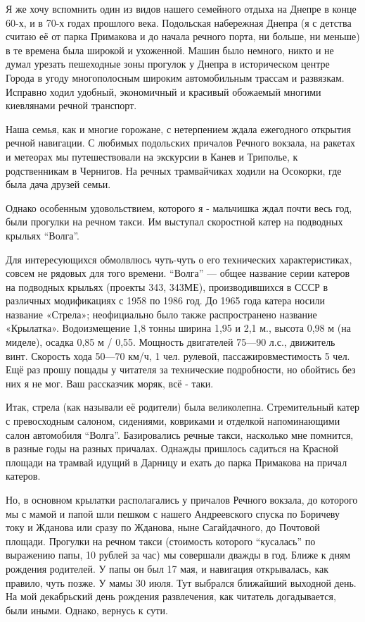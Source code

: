 Я же хочу вспомнить один из видов нашего семейного отдыха на Днепре в конце
60-х, и в 70-х годах прошлого века. Подольская набережная Днепра (я с детства
считаю её от парка Примакова и до начала речного порта, ни больше, ни меньше) в
те времена была широкой и ухоженной. Машин было немного, никто и не думал
урезать пешеходные зоны прогулок у Днепра в историческом центре Города в угоду
многополосным широким автомобильным трассам и развязкам. Исправно ходил
удобный, экономичный и красивый обожаемый многими киевлянами речной транспорт. 

Наша семья, как и многие горожане, с нетерпением ждала ежегодного открытия
речной навигации. С любимых подольских причалов Речного вокзала, на ракетах и
метеорах мы путешествовали на экскурсии в Канев и Триполье, к родственникам в
Чернигов. На речных трамвайчиках ходили на Осокорки, где была дача друзей
семьи. 

Однако особенным удовольствием, которого я - мальчишка ждал почти весь год,
были прогулки на речном такси. Им выступал скоростной катер на подводных
крыльях \enquote{Волга}. 

Для интересующихся обмолвлюсь чуть-чуть о его технических характеристиках,
совсем не рядовых для того времени. \enquote{Волга} — общее название серии
катеров на подводных крыльях (проекты 343, 343МЕ), производившихся в СССР в
различных модификациях с 1958 по 1986 год. До 1965 года катера носили название
«Стрела»; неофициально было также распространено название «Крылатка».
Водоизмещение 1,8 тонны ширина 1,95 и 2,1 м., высота 0,98 м (на миделе), осадка
0,85 м / 0,55. Мощность двигателей 75—90 л.с., движитель винт. Скорость хода
50—70 км/ч, 1 чел. рулевой, пассажировместимость 5 чел. Ещё раз прошу пощады у
читателя за технические подробности, но обойтись без них я не мог. Ваш
рассказчик моряк, всё - таки. 

Итак, стрела (как называли её родители) была великолепна. Стремительный катер с
превосходным салоном, сидениями, ковриками и отделкой напоминающими салон
автомобиля \enquote{Волга}. Базировались речные такси, насколько мне помнится,
в разные годы на разных причалах. Однажды пришлось садиться на Красной площади
на трамвай идущий в Дарницу и ехать до парка Примакова на причал катеров. 

Но, в основном крылатки располагались у причалов Речного вокзала, до которого
мы с мамой и папой шли пешком с нашего Андреевского спуска по Боричеву току и
Жданова или сразу по Жданова, ныне Сагайдачного, до Почтовой площади. Прогулки
на речном такси (стоимость которого \enquote{кусалась} по выражению папы, 10
рублей за час) мы совершали дважды в год.  Ближе к дням рождения родителей. У
папы он был 17 мая, и навигация открывалась, как правило, чуть позже. У мамы 30
июля. Тут выбрался ближайший выходной день.  На мой декабрьский день рождения
развлечения, как читатель догадывается, были иными. Однако, вернусь к сути. 

